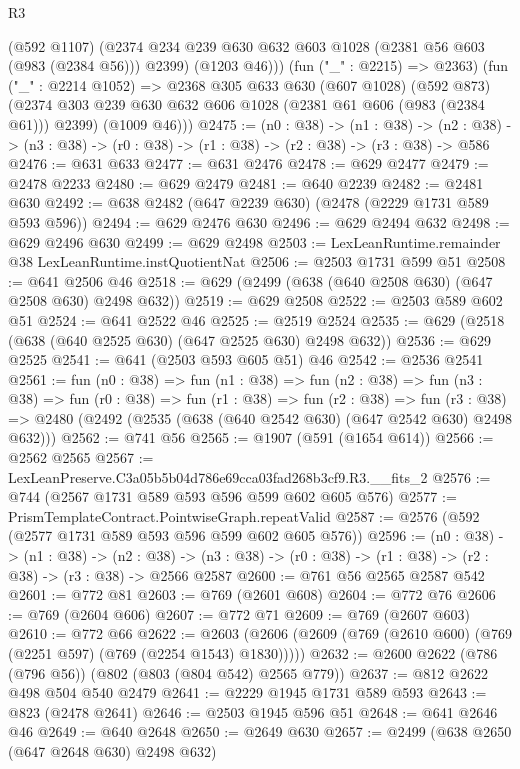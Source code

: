 \begin{lexlean}{R3}
\begin{coremodule}
          (@592 @1107)
          (@2374 @234 @239 @630 @632 @603 @1028 (@2381 @56 @603 (@983 (@2384 @56))) @2399)
          (@1203 @46)))
      (fun ("_" : @2215) => @2363)
      (fun ("_" : @2214 @1052) =>
      @2368
        @305
        @633
        @630
        (@607 @1028)
        (@592 @873)
        (@2374 @303 @239 @630 @632 @606 @1028 (@2381 @61 @606 (@983 (@2384 @61))) @2399)
        (@1009 @46)))
@2475 := (n0 : @38) ->
  (n1 : @38) ->
  (n2 : @38) -> (n3 : @38) -> (r0 : @38) -> (r1 : @38) -> (r2 : @38) -> (r3 : @38) -> @586
@2476 := @631 @633
@2477 := @631 @2476
@2478 := @629 @2477
@2479 := @2478 @2233
@2480 := @629 @2479
@2481 := @640 @2239
@2482 := @2481 @630
@2492 := @638 @2482 (@647 @2239 @630) (@2478 (@2229 @1731 @589 @593 @596))
@2494 := @629 @2476 @630
@2496 := @629 @2494 @632
@2498 := @629 @2496 @630
@2499 := @629 @2498
@2503 := LexLeanRuntime.remainder @38 LexLeanRuntime.instQuotientNat
@2506 := @2503 @1731 @599 @51
@2508 := @641 @2506 @46
@2518 := @629 (@2499 (@638 (@640 @2508 @630) (@647 @2508 @630) @2498 @632))
@2519 := @629 @2508
@2522 := @2503 @589 @602 @51
@2524 := @641 @2522 @46
@2525 := @2519 @2524
@2535 := @629 (@2518 (@638 (@640 @2525 @630) (@647 @2525 @630) @2498 @632))
@2536 := @629 @2525
@2541 := @641 (@2503 @593 @605 @51) @46
@2542 := @2536 @2541
@2561 := fun (n0 : @38) =>
  fun (n1 : @38) =>
  fun (n2 : @38) =>
  fun (n3 : @38) =>
  fun (r0 : @38) =>
  fun (r1 : @38) =>
  fun (r2 : @38) =>
  fun (r3 : @38) => @2480 (@2492 (@2535 (@638 (@640 @2542 @630) (@647 @2542 @630) @2498 @632)))
@2562 := @741 @56
@2565 := @1907 (@591 (@1654 @614))
@2566 := @2562 @2565
@2567 := LexLeanPreserve.C3a05b5b04d786e69cca03fad268b3cf9.R3.__fits_2
@2576 := @744 (@2567 @1731 @589 @593 @596 @599 @602 @605 @576)
@2577 := PrismTemplateContract.PointwiseGraph.repeatValid
@2587 := @2576 (@592 (@2577 @1731 @589 @593 @596 @599 @602 @605 @576))
@2596 := (n0 : @38) ->
  (n1 : @38) ->
  (n2 : @38) -> (n3 : @38) -> (r0 : @38) -> (r1 : @38) -> (r2 : @38) -> (r3 : @38) -> @2566 @2587
@2600 := @761 @56 @2565 @2587 @542
@2601 := @772 @81
@2603 := @769 (@2601 @608)
@2604 := @772 @76
@2606 := @769 (@2604 @606)
@2607 := @772 @71
@2609 := @769 (@2607 @603)
@2610 := @772 @66
@2622 := @2603 (@2606 (@2609 (@769 (@2610 @600) (@769 (@2251 @597) (@769 (@2254 @1543) @1830)))))
@2632 := @2600 @2622 (@786 (@796 @56)) (@802 (@803 (@804 @542) @2565 @779))
@2637 := @812 @2622 @498 @504 @540 @2479
@2641 := @2229 @1945 @1731 @589 @593
@2643 := @823 (@2478 @2641)
@2646 := @2503 @1945 @596 @51
@2648 := @641 @2646 @46
@2649 := @640 @2648
@2650 := @2649 @630
@2657 := @2499 (@638 @2650 (@647 @2648 @630) @2498 @632)

\end{coremodule}
\end{lexlean}
